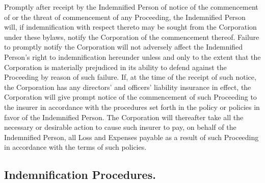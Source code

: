 \documentclass[11pt,american,letterpaper,]{constitution}
\begin{document}
Promptly after receipt by the Indemnified Person of notice of the commencement of or the threat of commencement of any Proceeding, the Indemnified Person will, if indemnification with respect thereto may be sought from the Corporation under these bylaws, notify the Corporation of the commencement thereof. Failure to promptly notify the Corporation will not adversely affect the Indemnified Person's right to indemnification hereunder unless and only to the extent that the Corporation is materially prejudiced in its ability to defend against the Proceeding by reason of such failure. If, at the time of the receipt of such notice, the Corporation has any directors' and officers' liability insurance in effect, the Corporation will give prompt notice of the commencement of such Proceeding to the insurer in accordance with the procedures set forth in the policy or policies in favor of the Indemnified Person. The Corporation will thereafter take all the necessary or desirable action to cause such insurer to pay, on behalf of the Indemnified Person, all Loss and Expenses payable as a result of such Proceeding in accordance with the terms of such policies.

\subsection{Indemnification Procedures.} 
\end{document}
